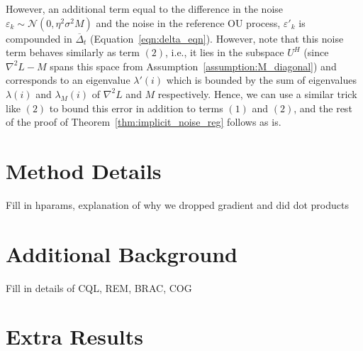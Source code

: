 However, an additional term equal to the difference in the noise $\varepsilon_k \sim \mathcal{N}(0, \eta^2 \sigma^2 M)$ and the noise in the reference OU process, $\varepsilon'_k$ is compounded in $\overline{\Delta}_t$ (Equation~\ref{eqn:delta_eqn}). However, note that this noise term behaves similarly as term $(2)$, i.e., it lies in the subspace $U^H$ (since $\nabla^2 L - M$ spans this space from Assumption~\ref{assumption:M_diagonal}) and corresponds to an eigenvalue $\lambda'(i)$ which is bounded by the sum of eigenvalues $\lambda(i)$ and $\lambda_M(i)$ of $\nabla^2 L $ and $M$ respectively. Hence, we can use a similar trick like $(2)$ to bound this error in addition to terms $(1)$ and $(2)$, and the rest of the proof of Theorem~\ref{thm:implicit_noise_reg} follows as is.

\section{Method Details}
\label{app:method_details}

Fill in hparams, explanation of why we dropped gradient and did dot products

\section{Additional Background}
\label{app:additional_background}

Fill in details of CQL, REM, BRAC, COG

\section{Extra Results}
\label{app;extra_results}

